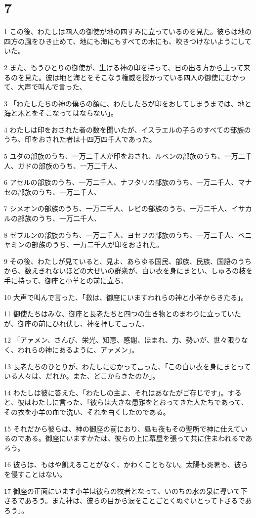 \chapter{7}

\par 1 この後、わたしは四人の御使が地の四すみに立っているのを見た。彼らは地の四方の風をひき止めて、地にも海にもすべての木にも、吹きつけないようにしていた。
\par 2 また、もうひとりの御使が、生ける神の印を持って、日の出る方から上って来るのを見た。彼は地と海とをそこなう権威を授かっている四人の御使にむかって、大声で叫んで言った、
\par 3 「わたしたちの神の僕らの額に、わたしたちが印をおしてしまうまでは、地と海と木とをそこなってはならない」。
\par 4 わたしは印をおされた者の数を聞いたが、イスラエルの子らのすべての部族のうち、印をおされた者は十四万四千人であった。
\par 5 ユダの部族のうち、一万二千人が印をおされ、ルベンの部族のうち、一万二千人、ガドの部族のうち、一万二千人、
\par 6 アセルの部族のうち、一万二千人、ナフタリの部族のうち、一万二千人、マナセの部族のうち、一万二千人、
\par 7 シメオンの部族のうち、一万二千人、レビの部族のうち、一万二千人、イサカルの部族のうち、一万二千人、
\par 8 ゼブルンの部族のうち、一万二千人、ヨセフの部族のうち、一万二千人、ベニヤミンの部族のうち、一万二千人が印をおされた。
\par 9 その後、わたしが見ていると、見よ、あらゆる国民、部族、民族、国語のうちから、数えきれないほどの大ぜいの群衆が、白い衣を身にまとい、しゅろの枝を手に持って、御座と小羊との前に立ち、
\par 10 大声で叫んで言った、「救は、御座にいますわれらの神と小羊からきたる」。
\par 11 御使たちはみな、御座と長老たちと四つの生き物とのまわりに立っていたが、御座の前にひれ伏し、神を拝して言った、
\par 12 「アァメン、さんび、栄光、知恵、感謝、ほまれ、力、勢いが、世々限りなく、われらの神にあるように、アァメン」。
\par 13 長老たちのひとりが、わたしにむかって言った、「この白い衣を身にまとっている人々は、だれか。また、どこからきたのか」。
\par 14 わたしは彼に答えた、「わたしの主よ、それはあなたがご存じです」。すると、彼はわたしに言った、「彼らは大きな患難をとおってきた人たちであって、その衣を小羊の血で洗い、それを白くしたのである。
\par 15 それだから彼らは、神の御座の前におり、昼も夜もその聖所で神に仕えているのである。御座にいますかたは、彼らの上に幕屋を張って共に住まわれるであろう。
\par 16 彼らは、もはや飢えることがなく、かわくこともない。太陽も炎暑も、彼らを侵すことはない。
\par 17 御座の正面にいます小羊は彼らの牧者となって、いのちの水の泉に導いて下さるであろう。また神は、彼らの目から涙をことごとくぬぐいとって下さるであろう」。

